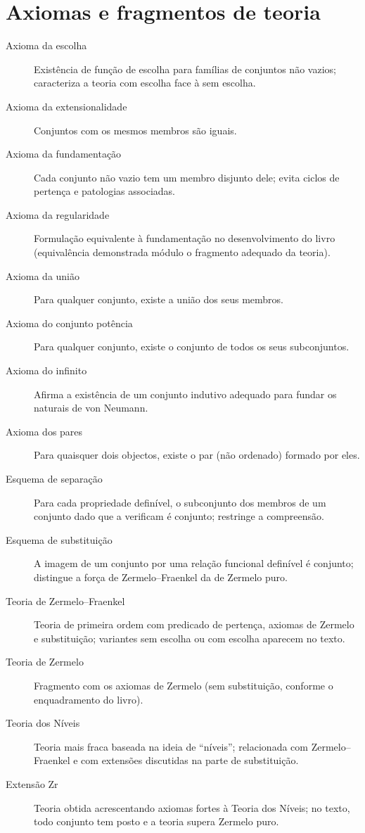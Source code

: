 \section*{Axiomas e fragmentos de teoria}

\begin{description}
\item[Axioma da escolha] Existência de função de escolha para famílias de conjuntos não vazios; caracteriza a teoria com escolha face à sem escolha.
\item[Axioma da extensionalidade] Conjuntos com os mesmos membros são iguais.
\item[Axioma da fundamentação] Cada conjunto não vazio tem um membro disjunto dele; evita ciclos de pertença e patologias associadas.
\item[Axioma da regularidade] Formulação equivalente à fundamentação no desenvolvimento do livro (equivalência demonstrada módulo o fragmento adequado da teoria).
\item[Axioma da união] Para qualquer conjunto, existe a união dos seus membros.
\item[Axioma do conjunto potência] Para qualquer conjunto, existe o conjunto de todos os seus subconjuntos.
\item[Axioma do infinito] Afirma a existência de um conjunto indutivo adequado para fundar os naturais de von Neumann.
\item[Axioma dos pares] Para quaisquer dois objectos, existe o par (não ordenado) formado por eles.
\item[Esquema de separação] Para cada propriedade definível, o subconjunto dos membros de um conjunto dado que a verificam é conjunto; restringe a compreensão.
\item[Esquema de substituição] A imagem de um conjunto por uma relação funcional definível é conjunto; distingue a força de Zermelo--Fraenkel da de Zermelo puro.
\item[Teoria de Zermelo--Fraenkel] Teoria de primeira ordem com predicado de pertença, axiomas de Zermelo e substituição; variantes sem escolha ou com escolha aparecem no texto.
\item[Teoria de Zermelo] Fragmento com os axiomas de Zermelo (sem substituição, conforme o enquadramento do livro).
\item[Teoria dos Níveis] Teoria mais fraca baseada na ideia de ``níveis''; relacionada com Zermelo--Fraenkel e com extensões discutidas na parte de substituição.
\item[Extensão Zr] Teoria obtida acrescentando axiomas fortes à Teoria dos Níveis; no texto, todo conjunto tem posto e a teoria supera Zermelo puro.
\end{description}

